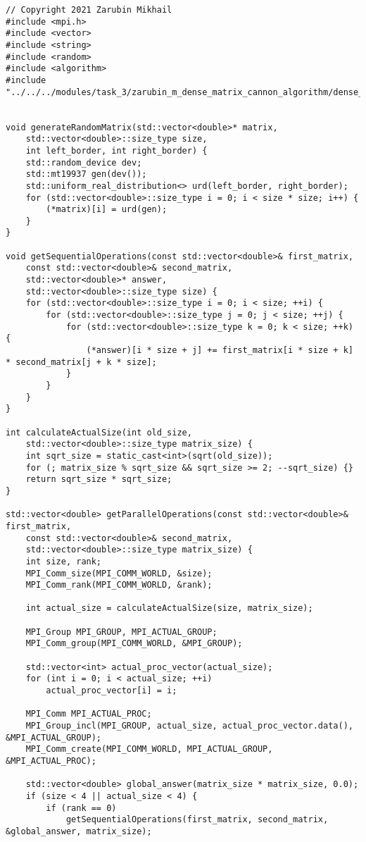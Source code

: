 \documentclass{report}
\begin{document}
\begin{lstlisting}
// Copyright 2021 Zarubin Mikhail
#include <mpi.h>
#include <vector>
#include <string>
#include <random>
#include <algorithm>
#include "../../../modules/task_3/zarubin_m_dense_matrix_cannon_algorithm/dense_matrix_cannon_algorithm.h"


void generateRandomMatrix(std::vector<double>* matrix,
    std::vector<double>::size_type size,
    int left_border, int right_border) {
    std::random_device dev;
    std::mt19937 gen(dev());
    std::uniform_real_distribution<> urd(left_border, right_border);
    for (std::vector<double>::size_type i = 0; i < size * size; i++) {
        (*matrix)[i] = urd(gen);
    }
}

void getSequentialOperations(const std::vector<double>& first_matrix,
    const std::vector<double>& second_matrix,
    std::vector<double>* answer,
    std::vector<double>::size_type size) {
    for (std::vector<double>::size_type i = 0; i < size; ++i) {
        for (std::vector<double>::size_type j = 0; j < size; ++j) {
            for (std::vector<double>::size_type k = 0; k < size; ++k) {
                (*answer)[i * size + j] += first_matrix[i * size + k] * second_matrix[j + k * size];
            }
        }
    }
}

int calculateActualSize(int old_size,
    std::vector<double>::size_type matrix_size) {
    int sqrt_size = static_cast<int>(sqrt(old_size));
    for (; matrix_size % sqrt_size && sqrt_size >= 2; --sqrt_size) {}
    return sqrt_size * sqrt_size;
}

std::vector<double> getParallelOperations(const std::vector<double>& first_matrix,
    const std::vector<double>& second_matrix,
    std::vector<double>::size_type matrix_size) {
    int size, rank;
    MPI_Comm_size(MPI_COMM_WORLD, &size);
    MPI_Comm_rank(MPI_COMM_WORLD, &rank);

    int actual_size = calculateActualSize(size, matrix_size);

    MPI_Group MPI_GROUP, MPI_ACTUAL_GROUP;
    MPI_Comm_group(MPI_COMM_WORLD, &MPI_GROUP);

    std::vector<int> actual_proc_vector(actual_size);
    for (int i = 0; i < actual_size; ++i)
        actual_proc_vector[i] = i;

    MPI_Comm MPI_ACTUAL_PROC;
    MPI_Group_incl(MPI_GROUP, actual_size, actual_proc_vector.data(), &MPI_ACTUAL_GROUP);
    MPI_Comm_create(MPI_COMM_WORLD, MPI_ACTUAL_GROUP, &MPI_ACTUAL_PROC);

    std::vector<double> global_answer(matrix_size * matrix_size, 0.0);
    if (size < 4 || actual_size < 4) {
        if (rank == 0)
            getSequentialOperations(first_matrix, second_matrix, &global_answer, matrix_size);


\end{lstlisting}
\end{document}
